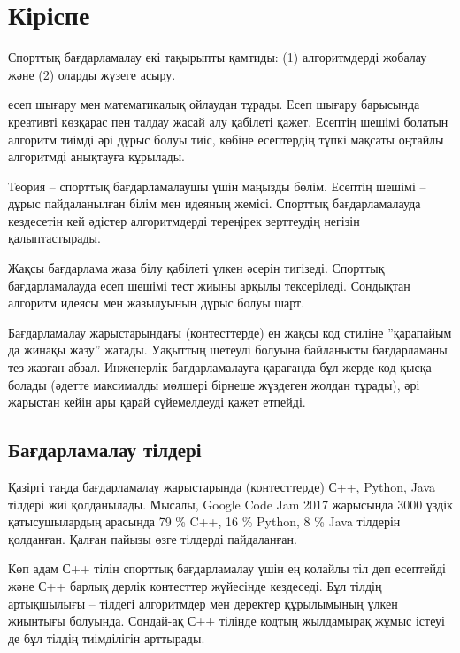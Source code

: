 \chapter{Кіріспе}

Спорттық бағдарламалау екі тақырыпты қамтиды:
(1) алгоритмдерді жобалау және (2) оларды жүзеге асыру.

 есеп шығару мен математикалық ойлаудан тұрады.
Есеп шығару барысында креативті көзқарас пен талдау жасай алу қабілеті қажет.
Есептің шешімі болатын алгоритм тиімді әрі дұрыс болуы тиіс, 
көбіне есептердің түпкі мақсаты оңтайлы алгоритмді анықтауға құрылады.

Теория -- спорттық бағдарламалаушы үшін маңызды бөлім. 
Есептің шешімі -- дұрыс пайдаланылған білім мен идеяның жемісі.
Спорттық бағдарламалауда кездесетін кей әдістер алгоритмдерді тереңірек зерттеудің негізін қалыптастырады.

Жақсы бағдарлама жаза білу қабілеті  
үлкен әсерін тигізеді.
Спорттық бағдарламалауда есеп шешімі тест жиыны арқылы тексеріледі.
Сондықтан алгоритм идеясы мен жазылуының дұрыс болуы шарт.

Бағдарламалау жарыстарындағы (контесттерде) ең жақсы код стиліне ''қарапайым да жинақы жазу'' жатады. 
Уақыттың шетеулі болуына байланысты бағдарламаны тез жазған абзал.
Инженерлік бағдарламалауға қарағанда бұл жерде код қысқа болады (әдетте максималды мөлшері бірнеше жүздеген жолдан тұрады), әрі жарыстан кейін ары қарай сүйемелдеуді қажет етпейді.

\section{Бағдарламалау тілдері}


Қазіргі таңда бағдарламалау жарыстарында (контесттерде) С++, Python, Java тілдері жиі қолданылады. 
Мысалы, Google Code Jam 2017 жарысында
3000 үздік қатысушылардың арасында
79 \% C++,
16 \% Python,
8 \%  Java \cite{goo17} тілдерін қолданған.
Қалған пайызы өзге тілдерді пайдаланған.

Көп адам С++ тілін спорттық бағдарламалау 
үшін ең қолайлы тіл деп есептейді
және С++ барлық дерлік контесттер жүйесінде кездеседі.
Бұл тілдің артықшылығы – тілдегі алгоритмдер мен деректер 
құрылымының үлкен жиынтығы болуында. Сондай-ақ С++ тілінде кодтың жылдамырақ жұмыс істеуі де бұл тілдің тиімділігін арттырады.  

